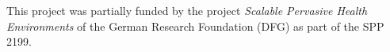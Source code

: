 \documentclass[sigconf]{acmart}
\begin{document}
\maketitle






\begin{acks}
This project was partially funded by the project \textit{Scalable Pervasive Health Environments} of the German Research Foundation (DFG) as part of the SPP 2199.
\end{acks}




\appendix
\end{document}
